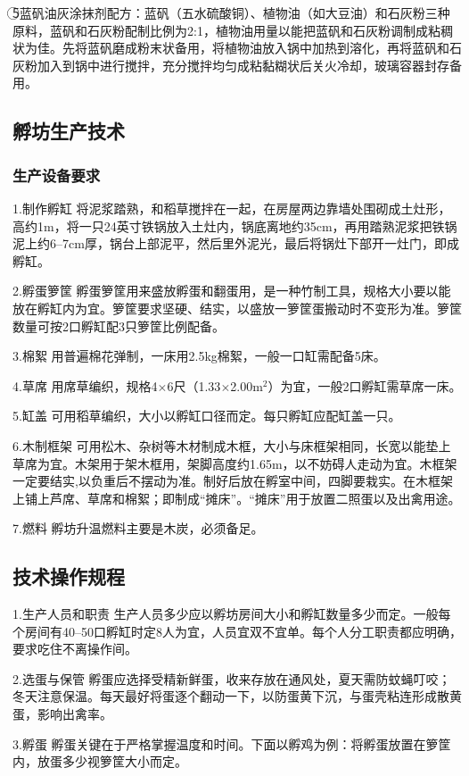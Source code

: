 \documentclass{ctexbook}
\begin{document}
\textcircled{5}蓝矾油灰涂抹剂配方：蓝矾（五水硫酸铜）、植物油（如大豆油）和石灰粉三种原料，蓝矾和石灰粉配制比例为2:1，植物油用量以能把蓝矾和石灰粉调制成粘稠状为佳。先将蓝矾磨成粉末状备用，将植物油放入锅中加热到溶化，再将蓝矾和石灰粉加入到锅中进行搅拌，充分搅拌均匀成粘黏糊状后关火冷却，玻璃容器封存备用。
\subsection{孵坊生产技术}
\subsubsection{生产设备要求}
1.制作孵缸 将泥浆踏熟，和稻草搅拌在一起，在房屋两边靠墙处围砌成土灶形，高约1m，将一只24英寸铁锅放入土灶内，锅底离地约35cm，再用踏熟泥浆把铁锅泥上约6--7cm厚，锅台上部泥平，然后里外泥光，最后将锅灶下部开一灶门，即成孵缸。

2.孵蛋箩筐 孵蛋箩筐用来盛放孵蛋和翻蛋用，是一种竹制工具，规格大小要以能放在孵缸内为宜。箩筐要求坚硬、结实，以盛放一箩筐蛋搬动时不变形为准。箩筐数量可按2口孵缸配3只箩筐比例配备。

3.棉絮 用普遍棉花弹制，一床用2.5kg棉絮，一般一口缸需配备5床。

4.草席 用席草编织，规格4$\times$6尺（1.33$\times$2.00m$^2$）为宜，一般2口孵缸需草席一床。

5.缸盖 可用稻草编织，大小以孵缸口径而定。每只孵缸应配缸盖一只。

6.木制框架 可用松木、杂树等木材制成木框，大小与床框架相同，长宽以能垫上草席为宜。木架用于架木框用，架脚高度约1.65m，以不妨碍人走动为宜。木框架一定要结实,以负重后不摆动为准。制好后放在孵室中间，四脚要栽实。在木框架上铺上芦席、草席和棉絮；即制成“摊床”。“摊床”用于放置二照蛋以及出禽用途。

7.燃料 孵坊升温燃料主要是木炭，必须备足。
\subsection{技术操作规程}
1.生产人员和职责 生产人员多少应以孵坊房间大小和孵缸数量多少而定。一般每个房间有40--50口孵缸时定8人为宜，人员宜双不宜单。每个人分工职责都应明确，要求吃住不离操作间。

2.选蛋与保管 孵蛋应选择受精新鲜蛋，收来存放在通风处，夏天需防蚊蝇叮咬；冬天注意保温。每天最好将蛋逐个翻动一下，以防蛋黄下沉，与蛋壳粘连形成散黄蛋，影响出禽率。

3.孵蛋 孵蛋关键在于严格掌握温度和时间。下面以孵鸡为例：将孵蛋放置在箩筐内，放蛋多少视箩筐大小而定。
\end{document}
